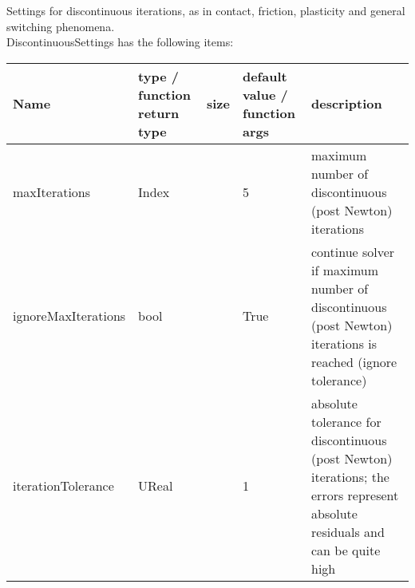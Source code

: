  \label{sec:DiscontinuousSettings}
Settings for discontinuous iterations, as in contact, friction, plasticity and general switching phenomena.\\ 
%
DiscontinuousSettings has the following items:
\begin{center}
  \footnotesize
  \begin{longtable}{| p{4.2cm} | p{2.5cm} | p{0.3cm} | p{3.0cm} | p{6cm} |}
    \hline
    \bf Name & \bf type / function return type & \bf size & \bf default value / function args & \bf description \\ \hline
    maxIterations &     Index &      &     5 &     maximum number of discontinuous (post Newton) iterations\\ \hline
    ignoreMaxIterations &     bool &      &     True &     continue solver if maximum number of discontinuous (post Newton) iterations is reached (ignore tolerance)\\ \hline
    iterationTolerance &     UReal &      &     1 &     absolute tolerance for discontinuous (post Newton) iterations; the errors represent absolute residuals and can be quite high\\ \hline
	  \end{longtable}
	\end{center}

